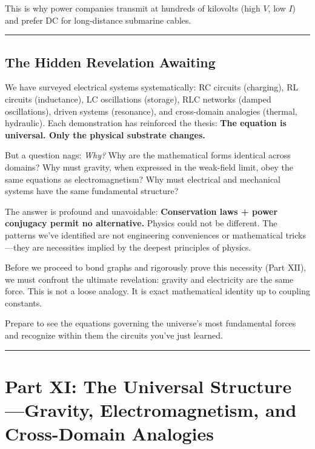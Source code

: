 \documentclass[
]{article}
\begin{document}
This is why power companies transmit at hundreds of kilovolts (high
\(V\), low \(I\)) and prefer DC for long-distance submarine cables.

\begin{center}\rule{0.5\linewidth}{0.5pt}\end{center}

\subsection{The Hidden Revelation
Awaiting}\label{the-hidden-revelation-awaiting}

We have surveyed electrical systems systematically: RC circuits
(charging), RL circuits (inductance), LC oscillations (storage), RLC
networks (damped oscillations), driven systems (resonance), and
cross-domain analogies (thermal, hydraulic). Each demonstration has
reinforced the thesis: \textbf{The equation is universal. Only the
physical substrate changes.}

But a question nags: \emph{Why?} Why are the mathematical forms
identical across domains? Why must gravity, when expressed in the
weak-field limit, obey the same equations as electromagnetism? Why must
electrical and mechanical systems have the same fundamental structure?

The answer is profound and unavoidable: \textbf{Conservation laws +
power conjugacy permit no alternative.} Physics could not be different.
The patterns we've identified are not engineering conveniences or
mathematical tricks---they are necessities implied by the deepest
principles of physics.

Before we proceed to bond graphs and rigorously prove this necessity
(Part XII), we must confront the ultimate revelation: gravity and
electricity are the same force. This is not a loose analogy. It is exact
mathematical identity up to coupling constants.

Prepare to see the equations governing the universe's most fundamental
forces and recognize within them the circuits you've just learned.

\begin{center}\rule{0.5\linewidth}{0.5pt}\end{center}

\section{Part XI: The Universal Structure---Gravity, Electromagnetism,
and Cross-Domain
Analogies}\label{part-xi-the-universal-structuregravity-electromagnetism-and-cross-domain-analogies}
\end{document}
